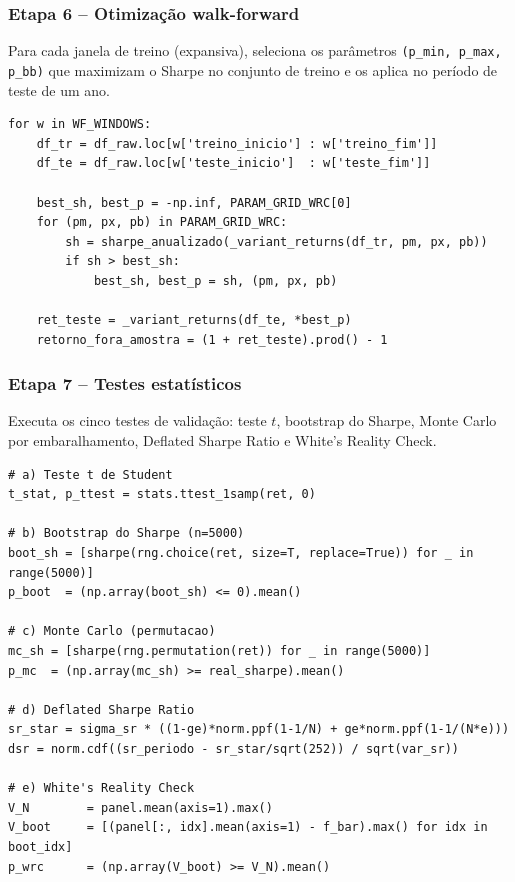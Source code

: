 \documentclass[a4paper,10pt]{article}
\begin{document}
\subsubsection*{Etapa 6 -- Otimização walk-forward}

Para cada janela de treino (expansiva), seleciona os parâmetros \texttt{(p\_min, p\_max, p\_bb)} que maximizam o Sharpe no conjunto de treino e os aplica no período de teste de um ano.

\begin{lstlisting}[caption={Núcleo da otimização walk-forward.}]
for w in WF_WINDOWS:
    df_tr = df_raw.loc[w['treino_inicio'] : w['treino_fim']]
    df_te = df_raw.loc[w['teste_inicio']  : w['teste_fim']]

    best_sh, best_p = -np.inf, PARAM_GRID_WRC[0]
    for (pm, px, pb) in PARAM_GRID_WRC:
        sh = sharpe_anualizado(_variant_returns(df_tr, pm, px, pb))
        if sh > best_sh:
            best_sh, best_p = sh, (pm, px, pb)

    ret_teste = _variant_returns(df_te, *best_p)
    retorno_fora_amostra = (1 + ret_teste).prod() - 1
\end{lstlisting}

\subsubsection*{Etapa 7 -- Testes estatísticos}

Executa os cinco testes de validação: teste $t$, bootstrap do Sharpe, Monte Carlo por embaralhamento, Deflated Sharpe Ratio e White's Reality Check.

\begin{lstlisting}[caption={Testes estatísticos (síntese).}]
# a) Teste t de Student
t_stat, p_ttest = stats.ttest_1samp(ret, 0)

# b) Bootstrap do Sharpe (n=5000)
boot_sh = [sharpe(rng.choice(ret, size=T, replace=True)) for _ in range(5000)]
p_boot  = (np.array(boot_sh) <= 0).mean()

# c) Monte Carlo (permutacao)
mc_sh = [sharpe(rng.permutation(ret)) for _ in range(5000)]
p_mc  = (np.array(mc_sh) >= real_sharpe).mean()

# d) Deflated Sharpe Ratio
sr_star = sigma_sr * ((1-ge)*norm.ppf(1-1/N) + ge*norm.ppf(1-1/(N*e)))
dsr = norm.cdf((sr_periodo - sr_star/sqrt(252)) / sqrt(var_sr))

# e) White's Reality Check
V_N        = panel.mean(axis=1).max()
V_boot     = [(panel[:, idx].mean(axis=1) - f_bar).max() for idx in boot_idx]
p_wrc      = (np.array(V_boot) >= V_N).mean()
\end{lstlisting}
\end{document}
